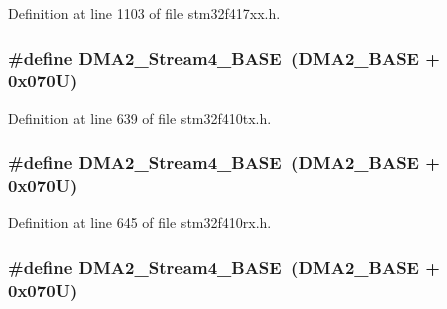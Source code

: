 Definition at line 1103 of file stm32f417xx.\+h.

\subsubsection[{\texorpdfstring{D\+M\+A2\+\_\+\+Stream4\+\_\+\+B\+A\+SE}{DMA2_Stream4_BASE}}]{\setlength{\rightskip}{0pt plus 5cm}\#define D\+M\+A2\+\_\+\+Stream4\+\_\+\+B\+A\+SE~({\bf D\+M\+A2\+\_\+\+B\+A\+SE} + 0x070\+U)}\hypertarget{group___peripheral__registers__structures_gad1e67740e6301233473f64638145dd1f}{}\label{group___peripheral__registers__structures_gad1e67740e6301233473f64638145dd1f}


Definition at line 639 of file stm32f410tx.\+h.

\subsubsection[{\texorpdfstring{D\+M\+A2\+\_\+\+Stream4\+\_\+\+B\+A\+SE}{DMA2_Stream4_BASE}}]{\setlength{\rightskip}{0pt plus 5cm}\#define D\+M\+A2\+\_\+\+Stream4\+\_\+\+B\+A\+SE~({\bf D\+M\+A2\+\_\+\+B\+A\+SE} + 0x070\+U)}\hypertarget{group___peripheral__registers__structures_gad1e67740e6301233473f64638145dd1f}{}\label{group___peripheral__registers__structures_gad1e67740e6301233473f64638145dd1f}


Definition at line 645 of file stm32f410rx.\+h.

\subsubsection[{\texorpdfstring{D\+M\+A2\+\_\+\+Stream4\+\_\+\+B\+A\+SE}{DMA2_Stream4_BASE}}]{\setlength{\rightskip}{0pt plus 5cm}\#define D\+M\+A2\+\_\+\+Stream4\+\_\+\+B\+A\+SE~({\bf D\+M\+A2\+\_\+\+B\+A\+SE} + 0x070\+U)}\hypertarget{group___peripheral__registers__structures_gad1e67740e6301233473f64638145dd1f}{}\label{group___peripheral__registers__structures_gad1e67740e6301233473f64638145dd1f}


